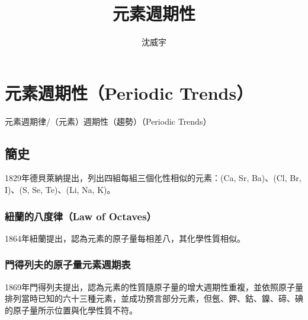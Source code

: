 \documentclass[a4paper,12pt]{article}
\begin{document}
\title{元素週期性}
\author{沈威宇}
\date{\temtoday}
\titletocdoc
\section{元素週期性（Periodic Trends）}
元素週期律/（元素）週期性（趨勢）（Periodic Trends）
\subsection{簡史}
1829年德貝萊納提出，列出四組每組三個化性相似的元素：(Ca, Sr, Ba)、(Cl, Br, I)、(S, Se, Te)、(Li, Na, K)。
\subsubsection{紐蘭的八度律（Law of Octaves）}
1864年紐蘭提出，認為元素的原子量每相差八，其化學性質相似。
\subsubsection{門得列夫的原子量元素週期表}
1869年門得列夫提出，認為元素的性質隨原子量的增大週期性重複，並依照原子量排列當時已知的六十三種元素，並成功預言部分元素，但氬、鉀、鈷、鎳、碲、碘的原子量所示位置與化學性質不符。
\end{document}
